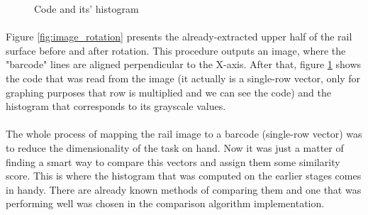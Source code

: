 \begin{figure}[H]
     \centering
     \vfill
     \caption{Code and its' histogram}
     \label{fig:code_with_histogram}
\end{figure}

\paragraph{}
Figure \ref{fig:image_rotation} presents the already-extracted upper half of the rail surface before and after rotation. This procedure outputs an image, where the "barcode" lines are aligned perpendicular to the X-axis. After that, figure \ref{fig:code_with_histogram} shows the code that was read from the image (it actually is a single-row vector, only for graphing purposes that row is multiplied and we can see the code) and the histogram that corresponds to its grayscale values.

\paragraph{}
The whole process of mapping the rail image to a barcode (single-row vector) was to reduce the dimensionality of the task on hand. Now it was just a matter of finding a smart way to compare this vectors and assign them some similarity score. This is where the histogram that was computed on the earlier stages comes in handy. There are already known methods of comparing them and one that was performing well was chosen in the comparison algorithm implementation.

